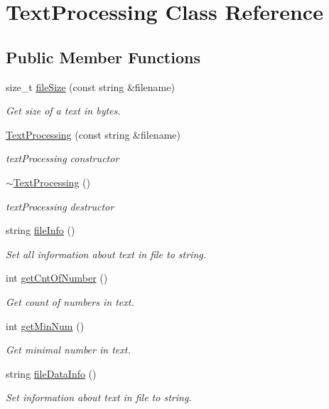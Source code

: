 \hypertarget{class_text_processing}{}\section{Text\+Processing Class Reference}
\label{class_text_processing}
\subsection*{Public Member Functions}
\begin{DoxyCompactItemize}
\item 
size\+\_\+t \hyperlink{class_text_processing_ad1b7ad56f6db82cbb6bc4d62ae926f54}{file\+Size} (const string \&filename)
\begin{DoxyCompactList}\small\item\em Get size of a text in bytes. \end{DoxyCompactList}\item 
\hyperlink{class_text_processing_a399a994c517098464e6baf626b9eec41}{Text\+Processing} (const string \&filename)
\begin{DoxyCompactList}\small\item\em text\+Processing constructor \end{DoxyCompactList}\item 
\mbox{\label{class_text_processing_a7484e860917020dcb95da95ad74767ac}} 
\hyperlink{class_text_processing_a7484e860917020dcb95da95ad74767ac}{$\sim$\+Text\+Processing} ()
\begin{DoxyCompactList}\small\item\em text\+Processing destructor \end{DoxyCompactList}\item 
string \hyperlink{class_text_processing_a80fe1430413b1f5d7b5d36c9cb0ef826}{file\+Info} ()
\begin{DoxyCompactList}\small\item\em Set all information about text in file to string. \end{DoxyCompactList}\item 
int \hyperlink{class_text_processing_a75a0c64b848a3c262411b925d8402da5}{get\+Cnt\+Of\+Number} ()
\begin{DoxyCompactList}\small\item\em Get count of numbers in text. \end{DoxyCompactList}\item 
int \hyperlink{class_text_processing_a725bc350ff62e442e2c1116402bcf180}{get\+Min\+Num} ()
\begin{DoxyCompactList}\small\item\em Get minimal number in text. \end{DoxyCompactList}\item 
string \hyperlink{class_text_processing_a0d8e701ef911b7094b071a6505ed3b38}{file\+Data\+Info} ()
\begin{DoxyCompactList}\small\item\em Set information about text in file to string. \end{DoxyCompactList}\end{DoxyCompactItemize}


